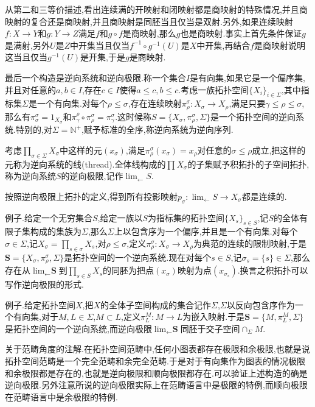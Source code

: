 从第二和三等价描述,看出连续满的开映射和闭映射都是商映射的特殊情况,并且商映射的复合还是商映射,并且商映射是同胚当且仅当是双射.另外,如果连续映射$f:X\to Y$和$g:Y\to Z$满足$f$和$g\circ f$是商映射,那么$g$也是商映射.事实上首先条件保证$g$是满射,另外$U$是$Z$中开集当且仅当$f^{-1}\circ g^{-1}(U)$是$X$中开集,再结合$f$是商映射说明这当且仅当$g^{-1}(U)$是开集,于是$g$是商映射.

最后一个构造是逆向系统和逆向极限.称一个集合$I$是有向集,如果它是一个偏序集,并且对任意的$a,b\in I$,存在$c\in I$使得$a\le c,b\le c$.考虑一族拓扑空间$\{X_i\}_{i\in\Sigma}$,其中指标集$\Sigma$是一个有向集.对每个$\rho\le\sigma$,存在连续映射$\pi_{\rho}^{\sigma}:X_{\sigma}\to X_{\rho}$,满足只要$\gamma\le\rho\le\sigma$,那么有$\pi_{\sigma}^{\sigma}=1_{X_{\sigma}}$和$\pi_{\gamma}^{\rho}\circ\pi_{\rho}^{\sigma}=\pi_{\gamma}^{\sigma}$.这时候称$S=\{X_{\sigma},\pi_{\rho}^{\sigma},\Sigma\}$是一个拓扑空间的逆向系统.特别的,对$\Sigma=\mathbb{N}^+$,赋予标准的全序,称逆向系统为逆向序列.

考虑$\prod_{\sigma\in\Sigma}X_{\sigma}$中这样的元$(x_{\sigma})$,满足$\pi_{\rho}^{\sigma}(x_{\sigma})=x_{\rho}$对任意的$\sigma\le\rho$成立,把这样的元称为逆向系统的线(thread).全体线构成的$\prod X_{\sigma}$的子集赋予积拓扑的子空间拓扑,称为逆向系统$S$的逆向极限,记作$\lim_{\leftarrow}S$.

按照逆向极限上拓扑的定义,得到所有投影映射$p_{\sigma}:\lim_{\leftarrow}S\to X_{\sigma}$都是连续的.

例子.给定一个无穷集合$S$,给定一族以$S$为指标集的拓扑空间$\{X_s\}_{s\in S}$,记$S$的全体有限子集构成的集族为$\Sigma$,那么$\Sigma$上以包含序为一个偏序,并且是一个有向集.对每个$\sigma\in\Sigma$,记$X_{\sigma}=\prod_{s\in\sigma}X_s$,对$\rho\le\sigma$,定义$\pi_{\rho}^{\sigma}:X_{\sigma}\to X_{\rho}$为典范的连续的限制映射,于是$\textbf{S}=\{X_{\sigma},\pi_{\rho}^{\sigma},\Sigma\}$是拓扑空间的一个逆向系统.现在对每个$s\in S$,记$\sigma_s=\{s\}\in\Sigma$,那么存在从$\lim_{\leftarrow}\textbf{S}$到$\prod_{s\in S}X_s$的同胚为把点$(x_{\sigma})$映射为点$(x_{\sigma_s})$.换言之积拓扑可以写作逆向极限的形式.

例子.给定拓扑空间$X$,把$X$的全体子空间构成的集合记作$\Sigma$,$\Sigma$以反向包含序作为一个有向集,对于$M,L\in\Sigma$,$M\subset L$,定义$\pi_L^M:M\to L$为嵌入映射.于是$\textbf{S}=\{M,\pi_L^M,\Sigma\}$是拓扑空间的一个逆向系统,而逆向极限$\lim_{\leftarrow}\textbf{S}$同胚于交子空间$\cap_{\Sigma} M$.

关于范畴角度的注解.在拓扑空间范畴中,任何小图表都存在极限和余极限,也就是说拓扑空间范畴是一个完全范畴和余完全范畴.于是对于有向集作为图表的情况极限和余极限都是存在的,也就是逆向极限和顺向极限都存在.可以验证上述构造的确是逆向极限.另外注意所说的逆向极限实际上在范畴语言中是极限的特例,而顺向极限在范畴语言中是余极限的特例.
\newpage
